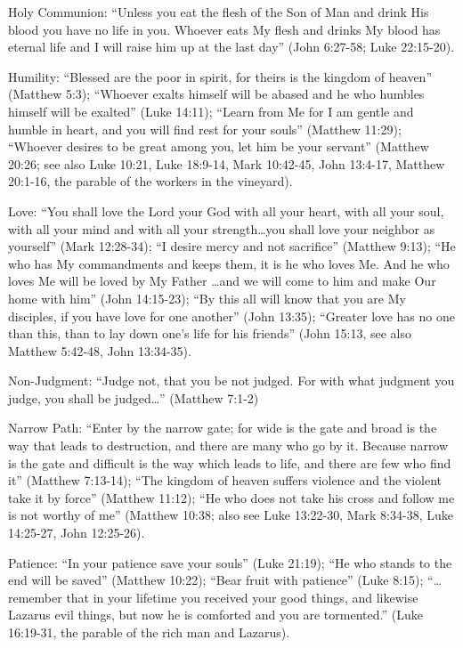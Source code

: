 Holy Communion: ``Unless you eat the flesh of the Son of Man and drink His blood you have no life in you. Whoever eats My flesh and drinks My blood has eternal life and I will raise him up at the last day'' (John 6:27-58; Luke 22:15-20).

Humility: ``Blessed are the poor in spirit, for theirs is the kingdom of heaven'' (Matthew 5:3); ``Whoever exalts himself will be abased and he who humbles himself will be exalted'' (Luke 14:11); ``Learn from Me for I am gentle and humble in heart, and you will find rest for your souls'' (Matthew 11:29); ``Whoever desires to be great among you, let him be your servant'' (Matthew 20:26; see also Luke 10:21, Luke 18:9-14, Mark 10:42-45, John 13:4-17, Matthew 20:1-16, the parable of the workers in the vineyard).

Love: ``You shall love the Lord your God with all your heart, with all your soul, with all your mind and with all your strength\ldots  you shall love your neighbor as yourself'' (Mark 12:28-34); ``I desire mercy and not sacrifice'' (Matthew 9:13); ``He who has My commandments and keeps them, it is he who loves Me. And he who loves Me will be loved by My Father \ldots and we will come to him and make Our home with him'' (John 14:15-23); ``By this all will know that you are My disciples, if you have love for one another'' (John 13:35); ``Greater love has no one than this, than to lay down one's life for his friends'' (John 15:13, see also Matthew 5:42-48, John 13:34-35).

Non-Judgment: ``Judge not, that you be not judged. For with what judgment you judge, you shall be judged\ldots '' (Matthew 7:1-2)

Narrow Path: ``Enter by the narrow gate; for wide is the gate and broad is the way that leads to destruction, and there are many who go by it. Because narrow is the gate and difficult is the way which leads to life, and there are few who find it'' (Matthew 7:13-14); ``The kingdom of heaven suffers violence and the violent take it by force'' (Matthew 11:12); ``He who does not take his cross and follow me is not worthy of me'' (Matthew 10:38; also see Luke 13:22-30, Mark 8:34-38, Luke 14:25-27, John 12:25-26).

Patience: ``In your patience save your souls'' (Luke 21:19); ``He who stands to the end will be saved'' (Matthew 10:22); ``Bear fruit with patience'' (Luke 8:15); ``\ldots  remember that in your lifetime you received your good things, and likewise Lazarus evil things, but now he is comforted and you are tormented.'' (Luke 16:19-31, the parable of the rich man and Lazarus).

